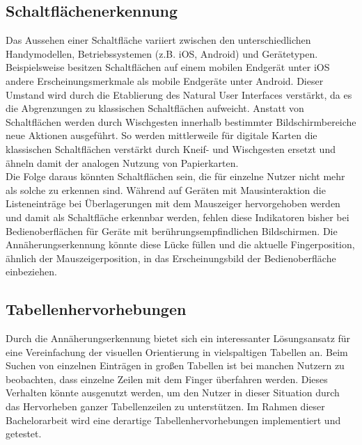 \documentclass[12pt,numbers=noenddot,parskip,bibliography=totocnumbered,listof=totocnumbered]{scrreprt}
\begin{document}
\subsection{Schaltflächenerkennung}\label{sec:schaltflächenerkennung}
Das Aussehen einer Schaltfläche variiert zwischen den unterschiedlichen Handymodellen, Betriebssystemen (z.B. iOS, Android) und Gerätetypen. Beispielsweise besitzen Schaltflächen auf einem mobilen Endgerät unter iOS andere Erscheinungsmerkmale als mobile Endgeräte unter Android. Dieser Umstand wird durch die Etablierung des Natural User Interfaces \citep{nui} verstärkt, da es die Abgrenzungen zu klassischen Schaltflächen aufweicht. Anstatt von Schaltflächen werden durch Wischgesten innerhalb bestimmter Bildschirmbereiche neue Aktionen ausgeführt. So werden mittlerweile für digitale Karten die klassischen Schaltflächen verstärkt durch Kneif- und Wischgesten ersetzt und ähneln damit der analogen Nutzung von Papierkarten.\\
Die Folge daraus könnten Schaltflächen sein, die für einzelne Nutzer nicht mehr als solche zu erkennen sind. Während auf Geräten mit Mausinteraktion die Listeneinträge bei Überlagerungen mit dem Mauszeiger hervorgehoben werden und damit als Schaltfläche erkennbar werden, fehlen diese Indikatoren bisher bei Bedienoberflächen für Geräte mit berührungsempfindlichen Bildschirmen. Die Annäherungserkennung könnte diese Lücke füllen und die aktuelle Fingerposition, ähnlich der Mauszeigerposition, in das Erscheinungsbild der Bedienoberfläche einbeziehen.

\subsection{Tabellenhervorhebungen}
Durch die Annäherungserkennung bietet sich ein interessanter Lösungsansatz für eine Vereinfachung der visuellen Orientierung in vielspaltigen Tabellen an. Beim Suchen von einzelnen Einträgen in großen Tabellen ist bei manchen Nutzern zu beobachten, dass einzelne Zeilen mit dem Finger überfahren werden. Dieses Verhalten könnte ausgenutzt werden, um den Nutzer in dieser Situation durch das Hervorheben ganzer Tabellenzeilen zu unterstützen. Im Rahmen dieser Bachelorarbeit wird eine derartige Tabellenhervorhebungen implementiert und getestet.
\end{document}
